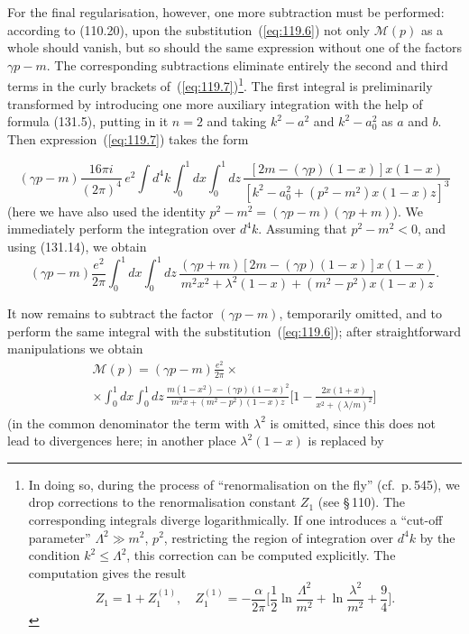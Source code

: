 For the final regularisation, however, one more subtraction must be performed: according to (110.20), upon the substitution~(\ref{eq:119.6}) not only $\mathcal{M}(p)$ as a whole should vanish, but so should the same expression without one of the factors $\gamma p - m$. The corresponding subtractions eliminate entirely the second and third terms in the curly brackets of~(\ref{eq:119.7})\footnote{In doing so, during the process of ``renormalisation on the fly'' (cf.\ p.\,545), we drop corrections to the renormalisation constant $Z_1$ (see \S\,110). The corresponding integrals diverge logarithmically. If one introduces a ``cut-off parameter'' $\Lambda^2 \gg m^2$, $p^2$, restricting the region of integration over $d^4k$ by the condition $k^2 \leqslant \Lambda^2$, this correction can be computed explicitly. The computation gives the result
\begin{equation}
Z_1 = 1 + Z_1^{(1)}, \quad Z_1^{(1)} = -\frac{\alpha}{2\pi}\bigg[\frac{1}{2}\ln\frac{\Lambda^2}{m^2} + \ln\frac{\lambda^2}{m^2} + \frac{9}{4}\bigg].
\label{eq:119.7a}
\end{equation}}.
The first integral is preliminarily transformed by introducing one more auxiliary integration with the help of formula (131.5), putting in it $n=2$ and taking $k^2 - a^2$ and $k^2 - a_0^2$ as $a$ and $b$. Then expression~(\ref{eq:119.7}) takes the form


\[
(\gamma p - m)\frac{16\pi i}{(2\pi)^4}\,e^2 \int d^4k \int_0^1 dx \int_0^1 dz\,\frac{[2m - (\gamma p)(1-x)]x(1-x)}{[k^2 - a_0^2 + (p^2 - m^2)x(1-x)z]^3}
\]
(here we have also used the identity $p^2 - m^2 = (\gamma p - m)(\gamma p + m)$). We immediately perform the integration over $d^4k$. Assuming that $p^2 - m^2 < 0$, and using (131.14), we obtain
\[
(\gamma p - m)\frac{e^2}{2\pi} \int_0^1 dx \int_0^1 dz\,\frac{(\gamma p + m)[2m - (\gamma p)(1-x)]x(1-x)}{m^2 x^2 + \lambda^2(1-x) + (m^2 - p^2)x(1-x)z}.
\]

It now remains to subtract the factor $(\gamma p - m)$, temporarily omitted, and to perform the same integral with the substitution~(\ref{eq:119.6}); after straightforward manipulations we obtain
\begin{multline}
\mathcal{M}(p) = (\gamma p - m)\frac{e^2}{2\pi} \times \\
\times \int_0^1 dx \int_0^1 dz\,\frac{m(1-x^2) - (\gamma p)(1-x)^2}{m^2 x + (m^2 - p^2)(1-x)z}\bigg[1 - \frac{2x(1+x)}{x^2 + (\lambda/m)^2}\bigg]
\label{eq:119.8}
\end{multline}
(in the common denominator the term with $\lambda^2$ is omitted, since this does not lead to divergences here; in another place $\lambda^2(1-x)$ is replaced by

